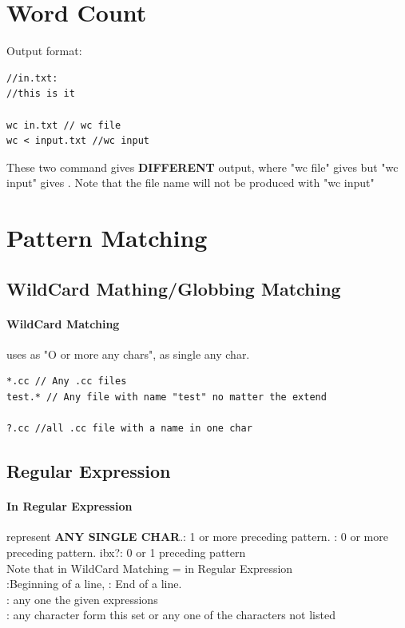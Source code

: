 \documentclass{report}
\begin{document}
\section{Word Count}
Output format: \\
\begin{lstlisting}
//in.txt: 
//this is it

wc in.txt // wc file
wc < input.txt //wc input
\end{lstlisting}
These two command gives \textbf{DIFFERENT} output, where "wc file" gives  but "wc input" gives . Note that the file name will not be produced with "wc input"

\section{Pattern Matching}
\subsection{WildCard Mathing/Globbing Matching}
\paragraph{WildCard Matching} uses \ibx{*} as "O or more any chars",  as single any char.
\begin{lstlisting}
*.cc // Any .cc files
test.* // Any file with name "test" no matter the extend

?.cc //all .cc file with a name in one char
\end{lstlisting}
\subsection{Regular Expression}
\paragraph{In Regular Expression}  represent \textbf{ANY SINGLE CHAR}.\ibx{+}: 1 or more preceding pattern. \ibx{*}: 0 or more preceding pattern. ibx{?}: 0 or 1 preceding pattern\\
Note that \ibx{*} in WildCard Matching =  in Regular Expression\\
\ibx{$\wedge$} :Beginning of a line, 
\ibx{$\$$} : End of a line.\\
: any one the given expressions\\
\ibx{[...]}: any character form this set \ibx{$[\wedge...]$} or \ibx{[!...]} any one of the characters not listed
\end{document}
